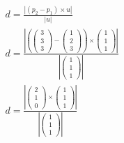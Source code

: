 \begin{align*}
    d = \frac{\left|\left(p_2 - p_1\right) \times u\right|}{\left|u\right|}                                             \\
    d = \frac{\left|\left(\begin{pmatrix}
                                  3 \\ 3 \\ 3
                              \end{pmatrix} - \begin{pmatrix}
                                                  1 \\ 2 \\ 3
                                              \end{pmatrix}\right) \times \begin{pmatrix}
                                                                              1 \\ 1 \\ 1
                                                                          \end{pmatrix}\right|}{\left|\begin{pmatrix}
                                                                                                          1 \\ 1 \\ 1
                                                                                                      \end{pmatrix}\right|} \\
    d = \frac{\left|\begin{pmatrix}
                            2 \\ 1 \\ 0
                        \end{pmatrix} \times \begin{pmatrix}
                                                 1 \\ 1 \\ 1
                                             \end{pmatrix}\right|}{\left|\begin{pmatrix}
                                                                             1 \\ 1 \\ 1
                                                                         \end{pmatrix}\right|}                              \\

\end{align*}
